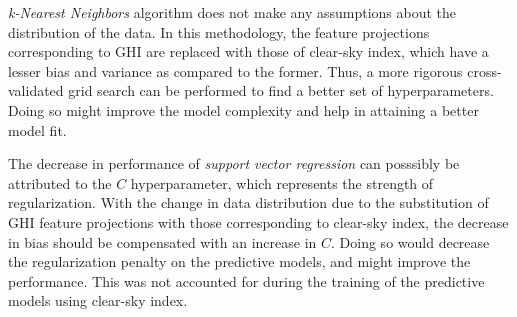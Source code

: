 \par \textit{k-Nearest Neighbors} algorithm does not make any assumptions about the distribution of the data. In this methodology, the feature projections corresponding to GHI are replaced with those of clear-sky index, which have a lesser bias and variance as compared to the former. Thus, a more rigorous cross-validated grid search can be performed to find a better set of hyperparameters. Doing so  might improve the model complexity and help in attaining a better model fit. 

\par The decrease in performance of \textit{support vector regression} can posssibly be attributed to the $C$ hyperparameter, which represents the strength of regularization. With the change in data distribution due to the substitution of GHI feature projections with those corresponding to clear-sky index, the decrease in bias should be compensated with an increase in $C$. Doing so would decrease the regularization penalty on the predictive models, and might improve the performance. This was not accounted for during the training of the predictive models using clear-sky index.

